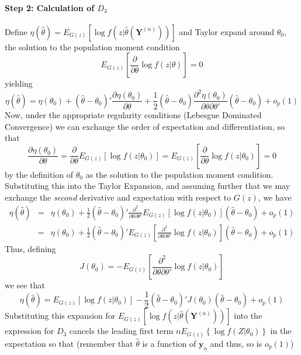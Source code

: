 \documentclass[12pt]{article}
\theoremstyle{definition}
\begin{document}
\paragraph{Step 2: Calculation of $D_3$} Define $\eta(\hat{\theta}) = E_{G(z)}\left[ \log{f\left(z|\hat{\theta}(\mathbf{Y}^{(n)})\right)} \right] $ and Taylor expand around $\theta_0$, the solution to the population moment condition
	$$E_{G(z)}\left[ \frac{\partial}{\partial \theta}  \log{f(z|\theta)} \right]=0$$
yielding
	$$\eta(\hat{\theta})= \eta(\theta_0) + \left( \hat{\theta} - \theta_0 \right)' \frac{\partial \eta(\theta_0)}{\partial \theta} + \frac{1}{2}\left( \hat{\theta} - \theta_0 \right)  \frac{\partial^2 \eta(\theta_0)}{\partial \theta \partial \theta'}\left( \hat{\theta} - \theta_0 \right) + o_p(1)$$
Now, under the appropriate regularity conditions (Lebesgue Dominated Convergence) we can exchange the order of expectation and differentiation, so that
	$$ \frac{\partial \eta(\theta_0)}{\partial \theta} =  \frac{\partial}{\partial \theta} E_{G(z)}\left[ \log{f(z|\theta_0)} \right]=  E_{G(z)}\left[\frac{\partial}{\partial \theta} \log{f(z|\theta_0)} \right]=0$$
by the definition of $\theta_0$ as the solution to the population moment condition. Substituting this into the Taylor Expansion, and assuming further that we may exchange the \emph{second} derivative and expectation with respect to $G(z)$, we have
	\begin{eqnarray*}
		\eta(\hat{\theta}) &=& \eta(\theta_0) + \frac{1}{2}\left( \hat{\theta} - \theta_0 \right) ' \frac{\partial^2 }{\partial \theta \partial \theta'} E_{G(z)}\left[ \log{f(z|\theta_0)} \right]\left( \hat{\theta} - \theta_0 \right) + o_p(1)\\
			&=&  \eta(\theta_0) + \frac{1}{2}\left( \hat{\theta} - \theta_0 \right) ' E_{G(z)}\left[ \frac{\partial^2 }{\partial \theta \partial \theta'} \log{f(z|\theta_0)} \right]\left( \hat{\theta} - \theta_0 \right) + o_p(1)
	\end{eqnarray*}
Thus, defining 
	$$J(\theta_0) = -E_{G(z)}\left[ \frac{\partial^2 }{\partial \theta \partial \theta'} \log{f(z|\theta_0)} \right]$$
we see that
	$$\eta(\hat{\theta}) = E_{G(z)}\left[ \log{f\left(z|\theta_0\right)} \right] - \frac{1}{2} \left( \hat{\theta}- \theta_0\right)'J(\theta_0)\left(\hat{\theta}- \theta_0\right) + o_p(1)$$
Substituting this expansion for $ E_{G(z)}\left[ \log{f\left(z|\hat{\theta}(\mathbf{Y}^{(n)})\right)} \right]$ into the expression for $D_3$ cancels the leading first term $nE_{G(z)}\left\{  \log{f\left(\left.Z\right|\theta_0\right)}\right\} $ in the expectation so that (remember that $\hat{\theta}$ is a function of $\mathbf{y}_n$ and thus, so is $o_p(1)$)
\end{document}
